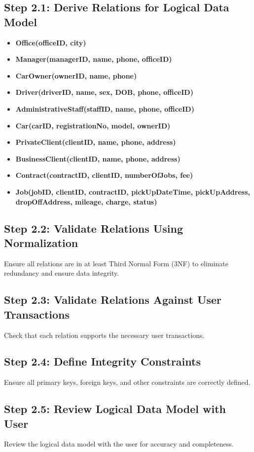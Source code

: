\documentclass[a4paper,12pt]{article}
\begin{document}
\subsection*{Step 2.1: Derive Relations for Logical Data Model}
\begin{itemize}
    \item \textbf{Office(officeID, city)}
    \item \textbf{Manager(managerID, name, phone, officeID)}
    \item \textbf{CarOwner(ownerID, name, phone)}
    \item \textbf{Driver(driverID, name, sex, DOB, phone, officeID)}
    \item \textbf{AdministrativeStaff(staffID, name, phone, officeID)}
    \item \textbf{Car(carID, registrationNo, model, ownerID)}
    \item \textbf{PrivateClient(clientID, name, phone, address)}
    \item \textbf{BusinessClient(clientID, name, phone, address)}
    \item \textbf{Contract(contractID, clientID, numberOfJobs, fee)}
    \item \textbf{Job(jobID, clientID, contractID, pickUpDateTime, pickUpAddress, dropOffAddress, mileage, charge, status)}
\end{itemize}

\subsection*{Step 2.2: Validate Relations Using Normalization}
Ensure all relations are in at least Third Normal Form (3NF) to eliminate redundancy and ensure data integrity.

\subsection*{Step 2.3: Validate Relations Against User Transactions}
Check that each relation supports the necessary user transactions.

\subsection*{Step 2.4: Define Integrity Constraints}
Ensure all primary keys, foreign keys, and other constraints are correctly defined.

\subsection*{Step 2.5: Review Logical Data Model with User}
Review the logical data model with the user for accuracy and completeness.
\end{document}
